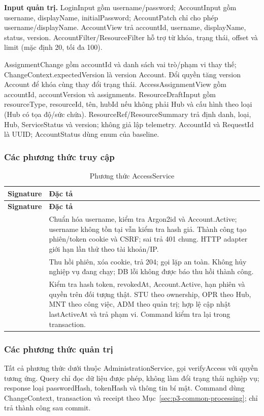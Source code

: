 \textbf{Input quản trị.} LoginInput gồm username/password; AccountInput gồm username, displayName, initialPassword; AccountPatch chỉ cho phép username/displayName. AccountView trả accountId, username, displayName, status, version. AccountFilter/ResourceFilter hỗ trợ từ khóa, trạng thái, offset và limit (mặc định 20, tối đa 100).

AssignmentChange gồm accountId và danh sách vai trò/phạm vi thay thế; ChangeContext.expectedVersion là version Account. Đổi quyền tăng version Account để khóa cùng thay đổi trạng thái. AccessAssignmentView gồm accountId, accountVersion và assignments. ResourceDraftInput gồm resourceType, resourceId, tên, hubId nếu không phải Hub và cấu hình theo loại (Hub có tọa độ/sức chứa). ResourceRef/ResourceSummary trả định danh, loại, Hub, ServiceStatus và version; không giả lập telemetry. AccountId và RequestId là UUID; AccountStatus dùng enum của baseline.

\subsubsection{Các phương thức truy cập}
\begin{longtable}{|L{58mm}|L{81mm}|}
\caption{Phương thức AccessService}\\\hline
\textbf{Signature} & \textbf{Đặc tả}\\\hline
\endfirsthead
\hline\textbf{Signature} & \textbf{Đặc tả}\\\hline\endhead
{} &
Chuẩn hóa username, kiểm tra Argon2id và Account.Active; username không tồn tại vẫn kiểm tra hash giả. Thành công tạo phiên/token cookie và CSRF; sai trả 401 chung. HTTP adapter giới hạn lần thử theo tài khoản/IP.\\\hline
{} &
Thu hồi phiên, xóa cookie, trả 204; gọi lặp an toàn. Không hủy nghiệp vụ đang chạy; DB lỗi không được báo thu hồi thành công.\\\hline
{} &
Kiểm tra hash token, revokedAt, Account.Active, hạn phiên và quyền trên đối tượng thật. STU theo ownership, OPR theo Hub, MNT theo công việc, ADM theo quản trị; hợp lệ cập nhật lastActiveAt và trả phạm vi. Command kiểm tra lại trong transaction.\\\hline
\end{longtable}

\subsubsection{Các phương thức quản trị}
Tất cả phương thức dưới thuộc AdministrationService, gọi verifyAccess với quyền tương ứng. Query chỉ đọc dữ liệu được phép, không làm đổi trạng thái nghiệp vụ; response loại passwordHash, tokenHash và thông tin bí mật. Command dùng ChangeContext, transaction và receipt theo Mục~\ref{sec:p3-common-processing}; chỉ trả thành công sau commit.


